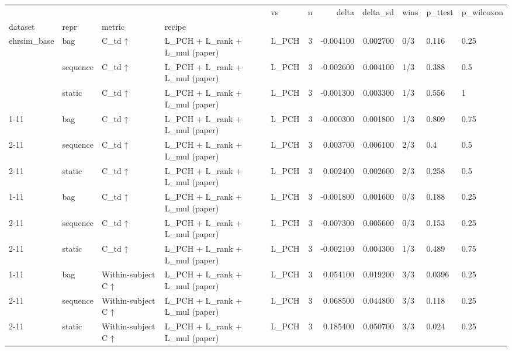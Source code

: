\begin{tabular}{lllllrrrlll}
\toprule
 &  &  &  & vs & n & delta & delta\_sd & wins & p\_ttest & p\_wilcoxon \\
dataset & repr & metric & recipe &  &  &  &  &  &  &  \\
\midrule
\multirow[t]{3}{*}{ehrsim\_base} & bag & C\_td ↑ & L\_PCH + L\_rank + L\_mul (paper) & L\_PCH & 3 & -0.004100 & 0.002700 & 0/3 & 0.116 & 0.25 \\
\cline{2-11} \cline{3-11}
 & sequence & C\_td ↑ & L\_PCH + L\_rank + L\_mul (paper) & L\_PCH & 3 & -0.002600 & 0.004100 & 1/3 & 0.388 & 0.5 \\
\cline{2-11} \cline{3-11}
 & static & C\_td ↑ & L\_PCH + L\_rank + L\_mul (paper) & L\_PCH & 3 & -0.001300 & 0.003300 & 1/3 & 0.556 & 1 \\
\cline{1-11} \cline{2-11} \cline{3-11}
\multirow[t]{3}{*}{ehrsim\_static} & bag & C\_td ↑ & L\_PCH + L\_rank + L\_mul (paper) & L\_PCH & 3 & -0.000300 & 0.001800 & 1/3 & 0.809 & 0.75 \\
\cline{2-11} \cline{3-11}
 & sequence & C\_td ↑ & L\_PCH + L\_rank + L\_mul (paper) & L\_PCH & 3 & 0.003700 & 0.006100 & 2/3 & 0.4 & 0.5 \\
\cline{2-11} \cline{3-11}
 & static & C\_td ↑ & L\_PCH + L\_rank + L\_mul (paper) & L\_PCH & 3 & 0.002400 & 0.002600 & 2/3 & 0.258 & 0.5 \\
\cline{1-11} \cline{2-11} \cline{3-11}
\multirow[t]{3}{*}{ehrsim\_temporal} & bag & C\_td ↑ & L\_PCH + L\_rank + L\_mul (paper) & L\_PCH & 3 & -0.001800 & 0.001600 & 0/3 & 0.188 & 0.25 \\
\cline{2-11} \cline{3-11}
 & sequence & C\_td ↑ & L\_PCH + L\_rank + L\_mul (paper) & L\_PCH & 3 & -0.007300 & 0.005600 & 0/3 & 0.153 & 0.25 \\
\cline{2-11} \cline{3-11}
 & static & C\_td ↑ & L\_PCH + L\_rank + L\_mul (paper) & L\_PCH & 3 & -0.002100 & 0.004300 & 1/3 & 0.489 & 0.75 \\
\cline{1-11} \cline{2-11} \cline{3-11}
\multirow[t]{3}{*}{ehrsim\_base} & bag & Within-subject C ↑ & L\_PCH + L\_rank + L\_mul (paper) & L\_PCH & 3 & 0.054100 & 0.019200 & 3/3 & 0.0396 & 0.25 \\
\cline{2-11} \cline{3-11}
 & sequence & Within-subject C ↑ & L\_PCH + L\_rank + L\_mul (paper) & L\_PCH & 3 & 0.068500 & 0.044800 & 3/3 & 0.118 & 0.25 \\
\cline{2-11} \cline{3-11}
 & static & Within-subject C ↑ & L\_PCH + L\_rank + L\_mul (paper) & L\_PCH & 3 & 0.185400 & 0.050700 & 3/3 & 0.024 & 0.25 \\

\end{tabular}
